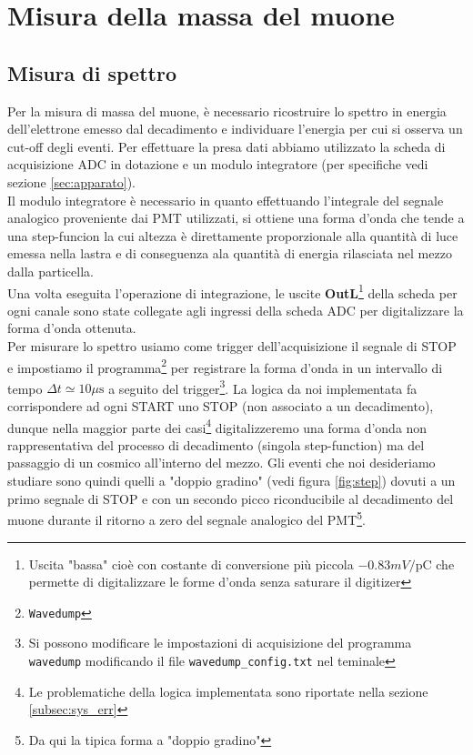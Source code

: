 \documentclass[10pt,a4paper]{article}
\begin{document}
\section{Misura della massa del muone}\label{sec:misura_massa}

\subsection{Misura di spettro}\label{sec:misura_spettro}
\begin{flushleft}
Per la misura di massa del muone, è necessario ricostruire lo spettro in energia dell'elettrone emesso dal decadimento e individuare l'energia per cui si osserva un cut-off degli eventi.
Per effettuare la presa dati abbiamo utilizzato la scheda di acquisizione ADC in dotazione e un modulo integratore (per specifiche vedi sezione \ref{sec:apparato}).\\
Il modulo integratore è necessario in quanto effettuando l'integrale del segnale analogico proveniente dai PMT utilizzati, si ottiene una forma d'onda che tende a una step-funcion la cui altezza è direttamente proporzionale alla quantità di luce emessa nella lastra e di conseguenza ala quantità di energia rilasciata nel mezzo dalla particella.\\
Una volta eseguita l'operazione di integrazione, le uscite \textbf{OutL}\footnote{Uscita "bassa" cioè con costante di conversione più piccola $-0.83 mV/\text{pC}$ che permette di digitalizzare le forme d'onda senza saturare il digitizer} della scheda per ogni canale sono state collegate agli ingressi della scheda ADC per digitalizzare la forma d'onda ottenuta.\\
Per misurare lo spettro usiamo come trigger dell'acquisizione il segnale di STOP e impostiamo il programma\footnote{\texttt{Wavedump}} per registrare la forma d'onda in un intervallo di tempo $\Delta t\simeq10\mu \text{s}$ a seguito del trigger\footnote{Si possono modificare le impostazioni di acquisizione del programma \texttt{wavedump} modificando il file \texttt{wavedump\_config.txt} nel teminale}. La logica da noi implementata fa corrispondere ad ogni START uno STOP (non associato a un decadimento), dunque nella maggior parte dei casi\footnote{Le problematiche della logica implementata sono riportate nella sezione \ref{subsec:sys_err}} digitalizzeremo una forma d'onda non rappresentativa del processo di decadimento (singola step-function) ma del passaggio di un cosmico all'interno del mezzo. Gli eventi che noi desideriamo studiare sono quindi quelli a "doppio gradino" (vedi figura \ref{fig:step}) dovuti a un primo segnale di STOP e con un secondo picco riconducibile al decadimento del muone durante il ritorno a zero del segnale analogico del PMT\footnote{Da qui la tipica forma a "doppio gradino"}.\\

\end{flushleft}
\end{document}
